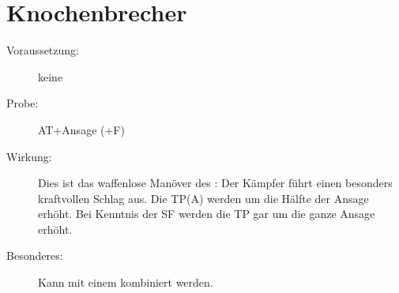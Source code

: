 \section{Knochenbrecher}
\label{uAT.knochenbrecher}
\begin{description}
    \item[Voraussetzung:]
        keine
    \item[Probe:]
        AT+Ansage (+F)
    \item[Wirkung:]
        Dies ist das waffenlose Manöver des :
        Der Kämpfer führt einen besonders kraftvollen Schlag aus.
        Die TP(A) werden um die Hälfte der Ansage erhöht.
        Bei Kenntnis der SF  werden die TP gar um die ganze Ansage erhöht.
    \item[Besonderes:]
        Kann mit einem  kombiniert werden.
\end{description}
